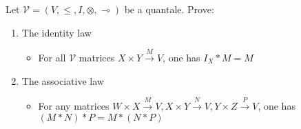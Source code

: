 
Let $\mathcal{V}=(V,\leq,I,\otimes,\multimap)$ be a quantale. Prove:
    \begin{enumerate}
      \item The identity law
            \begin{itemize}
              \item For all $\mathcal{V}$ matrices $X\times Y\xrightarrow{M}V$, one has $I_X * M = M$
            \end{itemize}
      \item The associative law
            \begin{itemize}
              \item For any matrices $W \times X \xrightarrow{M} V, X \times Y \xrightarrow{N} V, Y \times Z \xrightarrow{P} V$, one has $(M*N)*P=M*(N*P)$
            \end{itemize}
    \end{enumerate}
